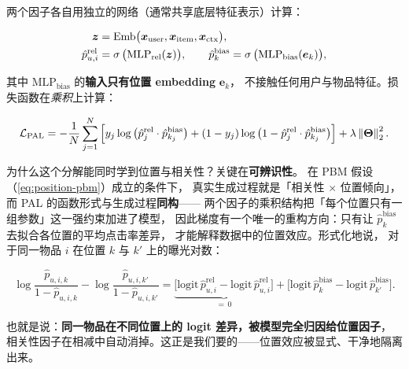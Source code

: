 两个因子各自用独立的网络（通常共享底层特征表示）计算：

\begin{align}
\bm{z} &= \mathrm{Emb}\big(\bm{x}_{\text{user}}, \bm{x}_{\text{item}}, \bm{x}_{\text{ctx}}\big), \notag \\
\hat{p}^{\mathrm{rel}}_{u,i} &= \operatorname{\sigma}\big( \mathrm{MLP}_{\mathrm{rel}}(\bm{z}) \big), \qquad
\hat{p}^{\mathrm{bias}}_{k} = \operatorname{\sigma}\big( \mathrm{MLP}_{\mathrm{bias}}(\bm{e}_k) \big),
\label{eq:pal-heads}
\end{align}

其中 $\mathrm{MLP}_{\mathrm{bias}}$ 的\textbf{输入只有位置 embedding} $\bm{e}_k$，
不接触任何用户与物品特征。损失函数在\emph{乘积}上计算：

\begin{equation}
\mathcal{L}_{\mathrm{PAL}} = -\frac{1}{N}\sum_{j=1}^{N}
\Big[ y_j \log\big( \hat{p}^{\mathrm{rel}}_{j} \cdot \hat{p}^{\mathrm{bias}}_{k_j} \big)
+ (1 - y_j)\log\big( 1 - \hat{p}^{\mathrm{rel}}_{j} \cdot \hat{p}^{\mathrm{bias}}_{k_j} \big) \Big]
+ \lambda \left\lVert \bm{\Theta} \right\rVert_2^2 .
\label{eq:pal-loss}
\end{equation}

为什么这个分解能同时学到位置与相关性？关键在\textbf{可辨识性}。
在 PBM 假设（\cref{eq:position-pbm}）成立的条件下，
真实生成过程就是「相关性 $\times$ 位置倾向」，
而 PAL 的函数形式与生成过程\textbf{同构}——
两个因子的乘积结构把「每个位置只有一组参数」这一强约束加进了模型，
因此梯度有一个唯一的重构方向：只有让 $\hat{p}^{\mathrm{bias}}_k$ 去拟合各位置的平均点击率差异，
才能解释数据中的位置效应。形式化地说，
对于同一物品 $i$ 在位置 $k$ 与 $k'$ 上的曝光对数：

\begin{equation}
\log \frac{\hat{p}_{u,i,k}}{1 - \hat{p}_{u,i,k}}
- \log \frac{\hat{p}_{u,i,k'}}{1 - \hat{p}_{u,i,k'}}
= \underbrace{\Big[ \mathrm{logit}\,\hat{p}^{\mathrm{rel}}_{u,i} - \mathrm{logit}\,\hat{p}^{\mathrm{rel}}_{u,i} \Big]}_{=\,0}
+ \Big[ \mathrm{logit}\,\hat{p}^{\mathrm{bias}}_{k} - \mathrm{logit}\,\hat{p}^{\mathrm{bias}}_{k'} \Big] .
\label{eq:pal-logit}
\end{equation}

也就是说：\textbf{同一物品在不同位置上的 logit 差异，被模型完全归因给位置因子}，
相关性因子在相减中自动消掉。这正是我们要的——位置效应被显式、干净地隔离出来。

